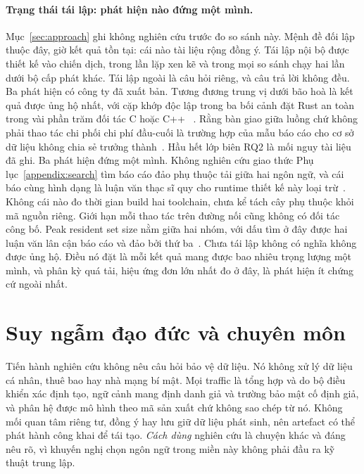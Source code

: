 \paragraph{Trạng thái tái lập: phát hiện nào đứng một mình.}
Mục~\ref{sec:approach} ghi không nghiên cứu trước đo so sánh này. Mệnh đề
đối lập thuộc đây, giờ kết quả tồn tại: cái nào tài liệu rộng đồng ý. Tái lập nội bộ được thiết kế vào chiến dịch, trong \NRepeats{} lần lặp xen kẽ và trong
mọi so sánh chạy hai lần dưới bộ cấp phát khác. Tái lập ngoài là câu hỏi
riêng, và câu trả lời không đều. Ba phát hiện có công ty đã xuất bản. Tương đương trung vị dưới
bão hoà là kết quả được ủng hộ nhất, với cặp khớp độc lập trong ba
bối cảnh đặt Rust an toàn trong vài phần trăm đối tác C hoặc C++
~\cite{emmerich2019drivers,li2021ipc,gonzalez2023rustudp}. Rằng bàn giao giữa luồng
chứ không phải thao tác chi phối chi phí đầu-cuối là trường hợp của mẫu báo cáo cho
cơ sở dữ liệu không chia sẻ trưởng thành~\cite{zhou2025oltp}. Hầu hết lớp biên RQ2 là mối nguy tài liệu đã ghi. Ba phát hiện đứng một mình. Không nghiên cứu giao thức
Phụ lục~\ref{appendix:search} tìm báo cáo đảo phụ thuộc tải giữa hai ngôn ngữ, và
cái báo cùng hình dạng là luận văn thạc sĩ quy cho runtime thiết kế này
loại trừ~\cite{arvidsson2025async}. Không cái nào đo thời gian build hai toolchain, chưa kể
tách cây phụ thuộc khỏi mã nguồn riêng. Giới hạn mỗi thao tác trên
đường nối cũng không có đối tác công bố. Peak resident set size nằm giữa hai nhóm, với
dấu tìm ở đây được hai luận văn lân cận báo cáo và đảo bởi
thứ ba~\cite{olsson2023ranmgmt,sundvisson2026drivers,karlback2021ran}. Chưa tái lập không
có nghĩa không được ủng hộ. Điều nó đặt là mỗi kết quả mang được bao nhiêu trọng lượng một mình, và phân kỳ
quá tải, hiệu ứng đơn lớn nhất đo ở đây, là phát hiện ít chứng cứ ngoài
nhất.

\section{Suy ngẫm đạo đức và chuyên môn}
Tiến hành nghiên cứu không nêu câu hỏi bảo vệ dữ liệu. Nó không xử lý dữ liệu
cá nhân, thuê bao hay nhà mạng bí mật. Mọi traffic là tổng hợp và do
bộ điều khiển xác định tạo, ngữ cảnh mang định danh giả và trường bảo mật
cố định giả, và phân hệ được mô hình theo mã sản xuất chứ không sao chép từ nó. Không mối quan tâm
riêng tư, đồng ý hay lưu giữ dữ liệu phát sinh, nên artefact có thể phát hành công khai để
tái tạo. \emph{Cách dùng} nghiên cứu là chuyện khác và đáng nêu rõ,
vì khuyến nghị chọn ngôn ngữ trong miền này không phải đầu ra kỹ thuật trung lập.

